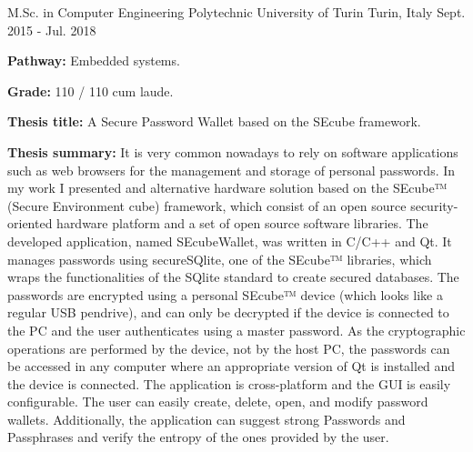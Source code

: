 

\begin{cventries}

  \cventry
    {M.Sc. in Computer Engineering}
    {Polytechnic University of Turin}
    {Turin, Italy}
    {Sept. 2015 - Jul. 2018}
    {
      \begin{cvitems}
        \item {\textbf{Pathway:} Embedded systems.}
        \item {\textbf{Grade:} 110 / 110 cum laude.}
        \item {\textbf{Thesis title:}  A Secure Password Wallet based on the
        SEcube framework.}
        \item {\textbf{Thesis summary:} It is very common nowadays to rely on software
        applications such as web browsers for the management and storage of personal
        passwords.
        In my work I presented and alternative hardware solution based on the SEcube™
        (Secure Environment cube) framework, which consist of an open source
        security-oriented hardware platform and a set of open source software libraries.
        The developed application, named SEcubeWallet,
        was written in C/C++ and Qt. It manages passwords using secureSQlite,
        one of the SEcube™ libraries, which wraps the functionalities of the SQlite
        standard to create secured databases. The passwords are encrypted using a
        personal SEcube™ device (which looks like a regular USB pendrive),
        and can only be decrypted if the device is connected to the PC and the
        user authenticates using a master password.
        As the cryptographic operations are performed by the device, not by the host PC, the
        passwords can be accessed in any computer where an appropriate
        version of Qt is installed and the device is connected.
        The application is cross-platform and the GUI is easily configurable.
        The user can easily create, delete, open,
        and modify password wallets. Additionally, the application can suggest strong Passwords and
        Passphrases and verify the entropy of the ones provided by the user.
        }
      \end{cvitems}
    }


\end{cventries}
